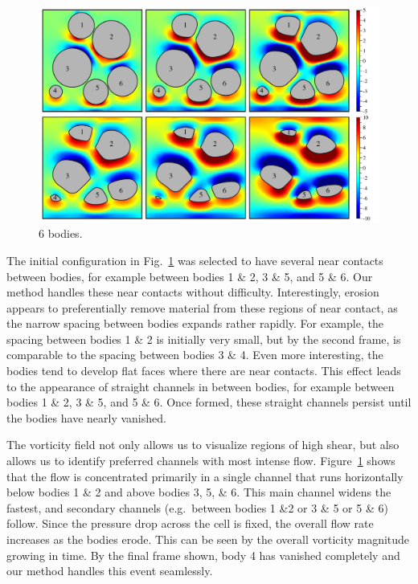 \documentclass[preprint, 10pt]{elsarticle}
\begin{document}
\begin{figure}%
\begin{center}
\includegraphics[width = 0.9 \textwidth]{./figs/06bod.pdf}
\caption{\label{fig:06bodies} 6 bodies.
}
\end{center}
\end{figure}

The initial configuration in  Fig.~\ref{fig:06bodies} was selected to have several near contacts between bodies, for example between bodies 1 \& 2, 3 \& 5, and 5 \& 6. Our method handles these near contacts without difficulty. Interestingly, erosion appears to preferentially remove material from these regions of near contact, as the narrow spacing between bodies expands rather rapidly. For example, the spacing between bodies 1 \& 2 is initially very small, but by the second frame, is comparable to the spacing between bodies 3 \& 4. Even more interesting, the bodies tend to develop flat faces where there are near contacts. This effect leads to the appearance of straight channels in between bodies, for example between bodies 1 \& 2, 3 \& 5, and 5 \& 6. Once formed, these straight channels persist until the bodies have nearly vanished.

The vorticity field not only allows us to visualize regions of high shear, but also allows us to identify preferred channels with most intense flow. Figure~\ref{fig:06bodies} shows that the flow is concentrated primarily in a single channel that runs horizontally below bodies 1 \& 2 and above bodies 3, 5, \& 6. This main channel widens the fastest, and secondary channels (e.g.~between bodies 1 \&2 or 3 \& 5 or 5 \& 6) follow. Since the pressure drop across the cell is fixed, the overall flow rate increases as the bodies erode. This can be seen by the overall vorticity magnitude growing in time. By the final frame shown, body 4 has vanished completely and our method handles this event seamlessly.
\end{document}
